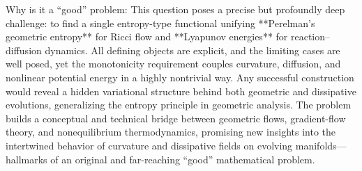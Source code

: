 Why is it a “good” problem:  
This question poses a precise but profoundly deep challenge: to find a single entropy-type functional unifying **Perelman’s geometric entropy** for Ricci flow and **Lyapunov energies** for reaction–diffusion dynamics. All defining objects are explicit, and the limiting cases are well posed, yet the monotonicity requirement couples curvature, diffusion, and nonlinear potential energy in a highly nontrivial way. Any successful construction would reveal a hidden variational structure behind both geometric and dissipative evolutions, generalizing the entropy principle in geometric analysis. The problem builds a conceptual and technical bridge between geometric flows, gradient-flow theory, and nonequilibrium thermodynamics, promising new insights into the intertwined behavior of curvature and dissipative fields on evolving manifolds—hallmarks of an original and far-reaching “good” mathematical problem.